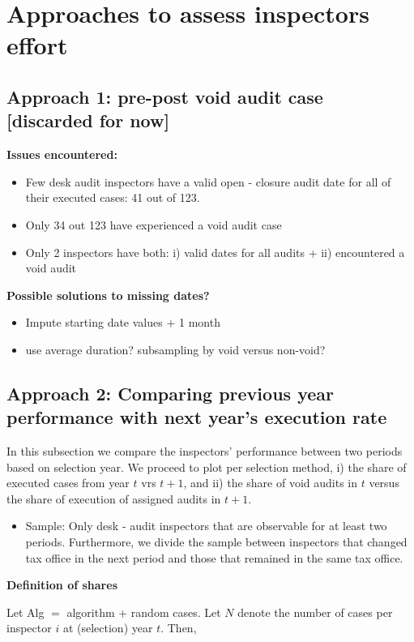 \documentclass{article}
\begin{document}
\section{Approaches to assess inspectors effort}
\subsection{Approach 1: pre-post void audit case  [discarded for now]}
\textbf{Issues encountered:}
\begin{itemize}
    \item{Few desk audit inspectors have a valid open - closure audit date for all of their executed cases: 41 out of 123.}
    \item{Only 34 out 123  have experienced a void audit case}
    \item{Only 2 inspectors have both: i) valid dates for all audits + ii) encountered a void audit}
\end{itemize}
\textbf{Possible solutions to missing dates?}
\begin{itemize}
    \item{Impute starting date values $+$ 1 month}
    \item{use average duration? subsampling by void versus non-void?}
\end{itemize}

\subsection{Approach 2: Comparing previous year performance with next year's execution rate }
In this subsection we compare the inspectors' performance between two periods based on selection year. We proceed to plot per selection method, i) the share of executed cases from  year $t$ vrs $t+1$, and ii) the share of void audits in $t$ versus the share of execution of assigned audits in $t+1$.  

\begin{itemize}
    \item{Sample: Only desk - audit inspectors that are observable for at least two periods. 
    Furthermore, we divide the sample  between inspectors that changed tax office in the next period and those that remained in the same tax office.}
\end{itemize}

\textbf{Definition of shares}

Let Alg $=$ algorithm  + random cases.
Let $N$ denote the number of cases per inspector $i$ at (selection) year $t$. Then, 
\end{document}
